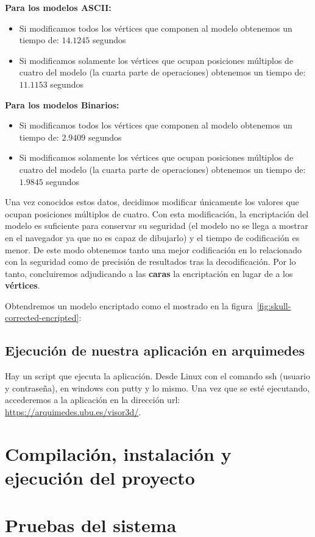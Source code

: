 \textbf{Para los modelos ASCII:}
\begin{itemize}
	\item Si modificamos todos los vértices que componen al modelo obtenemos un tiempo de: $14.1245$ segundos
	\item Si modificamos solamente los vértices que ocupan posiciones múltiplos de cuatro del modelo (la cuarta parte de operaciones) obtenemos un tiempo de: $11.1153$ segundos
\end{itemize}

\textbf{Para los modelos Binarios:}
\begin{itemize}
	\item Si modificamos todos los vértices que componen al modelo obtenemos un tiempo de: $2.9409$ segundos
	\item Si modificamos solamente los vértices que ocupan posiciones múltiplos de cuatro del modelo (la cuarta parte de operaciones) obtenemos un tiempo de: $1.9845$ segundos
\end{itemize}

Una vez conocidos estos datos, decidimos modificar únicamente los valores que ocupan posiciones múltiplos de cuatro. Con esta modificación, la encriptación del modelo es suficiente para conservar su seguridad (el modelo no se llega a mostrar en el navegador ya que no es capaz de dibujarlo) y el tiempo de codificación es menor. De este modo obtenemos tanto una mejor codificación en lo relacionado con la seguridad como de precisión de resultados tras la decodificación. Por lo tanto, concluiremos adjudicando a las \textbf{caras} la encriptación en lugar de a los \textbf{vértices}.

Obtendremos un modelo encriptado como el mostrado en la figura~\ref{fig:skull-corrected-encripted}:

\subsection{Ejecución de nuestra aplicación en arquimedes}
Hay un script que ejecuta la aplicación. Desde Linux con el comando ssh (usuario y contraseña), en windows con putty y lo mismo. Una vez que se esté ejecutando, accederemos a la aplicación en la dirección url: \url{https://arquimedes.ubu.es/visor3d/}.

\section{Compilación, instalación y ejecución del proyecto}

\section{Pruebas del sistema}
